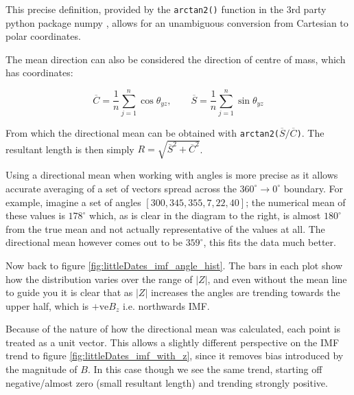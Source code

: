 \documentclass[12pt]{article}
\newcommand{\incfig}[2][1]{
    \def\svgwidth{#1\textwidth}
    
}
\begin{document}
This precise definition, provided by the \verb|arctan2()| \cite{arctan2} function in the 3rd party python package numpy \cite{numpy}, allows for an unambiguous conversion from Cartesian to polar coordinates. 

The mean direction can also be considered the direction of centre of mass, which has coordinates:

\begin{equation}
    \overline{C} = \frac{1}{n}\sum_{j=1}^n \cos\theta_{yz}, \qquad \overline{S}=\frac{1}{n}\sum_{j=1}^n\sin\theta_{yz}
\end{equation}

From which the directional mean can be obtained with \verb|arctan2(|$\overline{S}/\overline{C}$\verb|)|. The resultant length is then simply $R=\sqrt{\overline{S}^2+\overline{C}^2}$.

\begin{figure}
    \hspace{1cm}
    \vspace{-8mm}
    \incfig[0.3]{angleExample}
    \vspace{5mm}
\end{figure}

Using a directional mean when working with angles is more precise as it allows accurate averaging of a set of vectors spread across the $360^\circ\rightarrow0^\circ$ boundary. For example, imagine a set of angles $[300, 345, 355, 7, 22, 40]$; the numerical mean of these values is $178^\circ$ which, as is clear in the diagram to the right, is almost $180^\circ$ from the true mean and not actually representative of the values at all. The directional mean however comes out to be $359^\circ$, this fits the data much better.

Now back to figure \ref{fig:littleDates_imf_angle_hist}. The bars in each plot show how the distribution varies over the range of $|Z|$, and even without the mean line to guide you it is clear that as $|Z|$ increases the angles are trending towards the upper half, which is $+\text{ve}B_z$ i.e. northwards IMF.

Because of the nature of how the directional mean was calculated, each point is treated as a unit vector. This allows a slightly different perspective on the IMF trend to figure \ref{fig:littleDates_imf_with_z}, since it removes bias introduced by the magnitude of $B$. In this case though we see the same trend, starting off negative/almost zero (small resultant length) and trending strongly positive.
\end{document}

